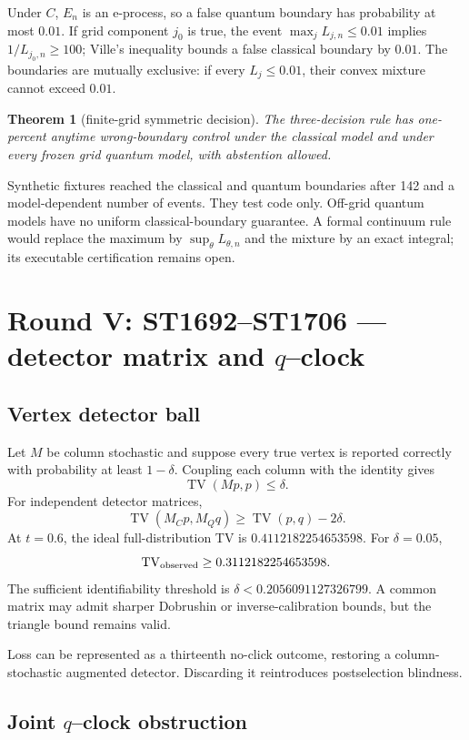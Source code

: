 \documentclass[11pt,a4paper]{article}
\newtheorem{theorem}{Theorem}\newcommand{\status}[1]{\textsf{[#1]}}
\begin{document}
Under $C$, $E_n$ is an e-process, so a false quantum boundary has probability
at most $0.01$.  If grid component $j_0$ is true, the event
$\max_jL_{j,n}\le0.01$ implies $1/L_{j_0,n}\ge100$; Ville's inequality bounds
a false classical boundary by $0.01$.  The boundaries are mutually exclusive:
if every $L_j\le0.01$, their convex mixture cannot exceed $0.01$.

\begin{theorem}[finite-grid symmetric decision]
The three-decision rule has one-percent anytime wrong-boundary control under
the classical model and under every frozen grid quantum model, with abstention
allowed.
\end{theorem}

Synthetic fixtures reached the classical and quantum boundaries after 142 and
a model-dependent number of events.  They test code only.  Off-grid quantum
models have no uniform classical-boundary guarantee.  A formal continuum rule
would replace the maximum by $\sup_\theta L_{\theta,n}$ and the mixture by an
exact integral; its executable certification remains open.

\section{Round V: ST1692--ST1706 --- detector matrix and $q$--clock}

\subsection{Vertex detector ball}

Let $M$ be column stochastic and suppose every true vertex is reported
correctly with probability at least $1-\delta$.  Coupling each column with the
identity gives
\[
\operatorname{TV}(Mp,p)\le\delta.
\]
For independent detector matrices,
\[
\operatorname{TV}(M_Cp,M_Qq)
\ge\operatorname{TV}(p,q)-2\delta.
\]
At $t=0.6$, the ideal full-distribution TV is $0.4112182254653598$.  For
$\delta=0.05$,
\[
\operatorname{TV}_{\rm observed}\ge0.3112182254653598.
\]
The sufficient identifiability threshold is
$\delta<0.2056091127326799$.  A common matrix may admit sharper Dobrushin or
inverse-calibration bounds, but the triangle bound remains valid.

Loss can be represented as a thirteenth no-click outcome, restoring a
column-stochastic augmented detector.  Discarding it reintroduces
postselection blindness.

\subsection{Joint $q$--clock obstruction}
\end{document}
